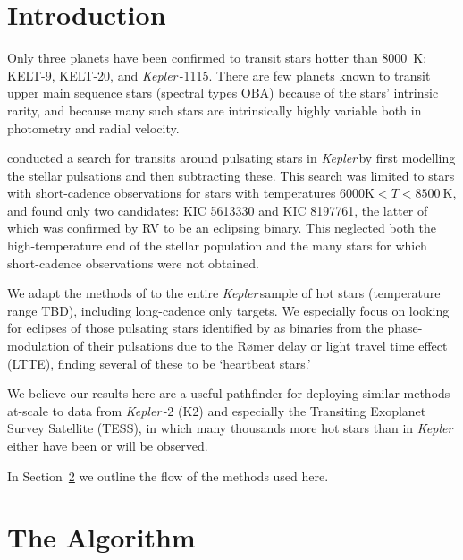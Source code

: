 \documentclass{aastex62}
\newcommand\kepler{\emph{Kepler}\,}
\begin{document}


\section{Introduction} \label{sec:intro}

Only three planets have been confirmed to transit stars hotter than 8000~K: KELT-9, KELT-20, and \kepler-1115. There are few planets known to transit upper main sequence stars (spectral types OBA) because of the stars' intrinsic rarity, and because many such stars are intrinsically highly variable both in photometry and radial velocity.

\citet{sowicka2017} conducted a search for transits around pulsating stars in \kepler by first modelling the stellar pulsations and then subtracting these. 
This search was limited to stars with short-cadence observations for stars with temperatures $6000 \text{K} < T < 8500~\text{K}$, and found only two candidates: KIC 5613330 and KIC 8197761, the latter of which was confirmed by RV to be an eclipsing binary. This neglected both the high-temperature end of the stellar population and the many stars for which short-cadence observations were not obtained.

We adapt the methods of \citet{sowicka2017} to the entire \kepler sample of hot stars (temperature range TBD), including long-cadence only targets. We especially focus on looking for eclipses of those pulsating stars identified by \citet{murphy2018} as binaries from the phase-modulation of their pulsations due to the R\o mer delay or light travel time effect (LTTE), finding several of these to be `heartbeat stars.'

We believe our results here are a useful pathfinder for deploying similar methods at-scale to data from \kepler-2 (K2) and especially the Transiting Exoplanet Survey Satellite (TESS), in which many thousands more hot stars than in \kepler either have been or will be observed.

In Section~\ref{algorithm} we outline the flow of the methods used here.

\newpage

\section{The Algorithm}
\label{algorithm}
\end{document}
